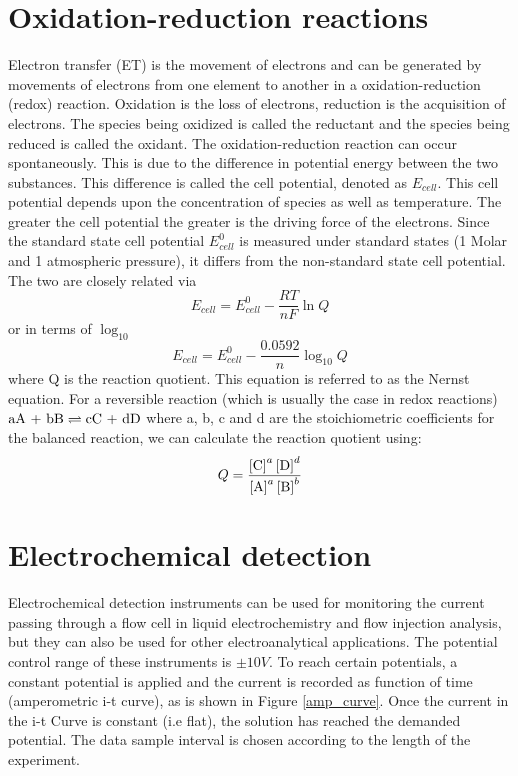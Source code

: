 \documentclass[twoside,single]{lion-msc}
\begin{document}
\section{Oxidation-reduction reactions}
Electron transfer (ET) is the movement of electrons and can be generated by movements of electrons from one element to another in a oxidation-reduction (redox) reaction. Oxidation is the loss of electrons, reduction is the acquisition of electrons. The species being oxidized is called the reductant and the species being reduced is called the oxidant. The oxidation-reduction reaction can occur spontaneously. This is due to the difference in potential energy between the two substances. This difference is called the cell potential, denoted as $E_{cell}$. This cell potential depends upon the concentration of species as well as temperature. The greater the cell potential the greater is the driving force of the electrons. Since the standard state cell potential $E^{0}_{cell}$ is measured under standard states (1 Molar and 1 atmospheric pressure), it differs from the non-standard state cell potential. The two are closely related via
\begin{equation} \label{nernst}
E_{cell} = E^{0}_{cell} - \frac{RT}{nF} \ln Q
\end{equation}
or in terms of $\log_{10}$
\begin{equation}
E_{cell} = E^{0}_{cell} - \frac{0.0592}{n} \log_{10} Q
\end{equation}
where Q is the reaction quotient. This equation is referred to as the Nernst equation. For a reversible reaction (which is usually the case in redox reactions) $\textup{aA + bB}\rightleftharpoons\textup{cC + dD}$ where a, b, c and d are the stoichiometric coefficients for the balanced reaction, we can calculate the reaction quotient using:
\begin{equation}
Q=\frac{\left [\textup{C}  \right ]^{a}\left [\textup{D}  \right ]^{d}}{\left [\textup{A}  \right ]^{a}\left [\textup{B}  \right ]^{b}}
\end{equation}

\section{Electrochemical detection}
Electrochemical detection instruments can be used for monitoring the current passing through a flow cell in liquid electrochemistry and flow injection analysis, but they can also be used for other electroanalytical applications. The potential control range of these instruments is $\pm10V$. To reach certain potentials, a constant potential is applied and the current is recorded as function of time (amperometric i-t curve), as is shown in Figure \ref{amp_curve}. Once the current in the i-t Curve is constant (i.e flat), the solution has reached the demanded potential. The data sample interval is chosen according to the length of the experiment.
\end{document}

